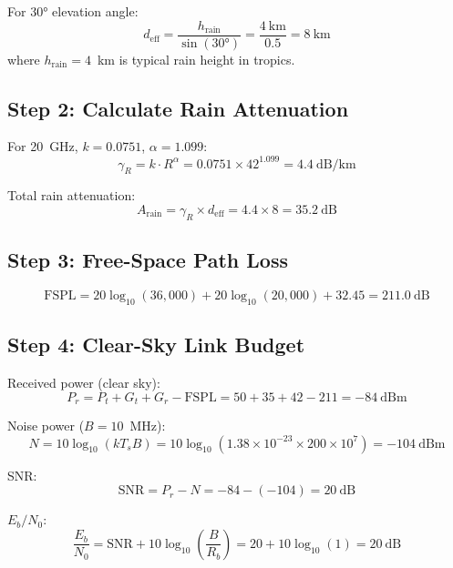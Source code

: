 For $30°$ elevation angle:
\begin{equation}
d_{\text{eff}} = \frac{h_{\text{rain}}}{\sin(30°)} = \frac{4~\text{km}}{0.5} = 8~\text{km}
\end{equation}
where $h_{\text{rain}} = 4$~km is typical rain height in tropics.

\subsection*{Step 2: Calculate Rain Attenuation}

For 20~GHz, $k = 0.0751$, $\alpha = 1.099$:
\begin{equation}
\gamma_R = k \cdot R^\alpha = 0.0751 \times 42^{1.099} = 4.4~\text{dB/km}
\end{equation}

Total rain attenuation:
\begin{equation}
A_{\text{rain}} = \gamma_R \times d_{\text{eff}} = 4.4 \times 8 = 35.2~\text{dB}
\end{equation}

\subsection*{Step 3: Free-Space Path Loss}

\begin{equation}
\text{FSPL} = 20\log_{10}(36{,}000) + 20\log_{10}(20{,}000) + 32.45 = 211.0~\text{dB}
\end{equation}

\subsection*{Step 4: Clear-Sky Link Budget}

Received power (clear sky):
\begin{equation}
P_r = P_t + G_t + G_r - \text{FSPL} = 50 + 35 + 42 - 211 = -84~\text{dBm}
\end{equation}

Noise power ($B = 10$~MHz):
\begin{equation}
N = 10\log_{10}(kT_sB) = 10\log_{10}(1.38 \times 10^{-23} \times 200 \times 10^7) = -104~\text{dBm}
\end{equation}

SNR:
\begin{equation}
\text{SNR} = P_r - N = -84 - (-104) = 20~\text{dB}
\end{equation}

$E_b/N_0$:
\begin{equation}
\frac{E_b}{N_0} = \text{SNR} + 10\log_{10}\left(\frac{B}{R_b}\right) = 20 + 10\log_{10}(1) = 20~\text{dB}
\end{equation}

